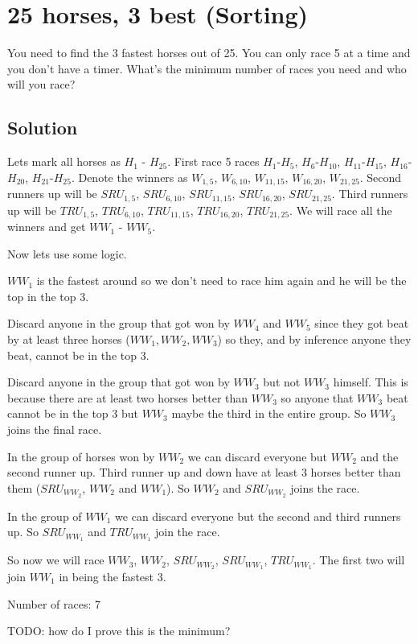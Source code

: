\documentclass{article}
\begin{document}
\section{25 horses, 3 best (Sorting)}
You need to find the 3 fastest horses out of 25. You can only race 5 at a time and you don't have a timer. What's
the minimum number of races you need and who will you race?

\subsection{Solution}
Lets mark all horses as $H_1$ - $H_{25}$.
First race 5 races $H_1$-$H_5$, $H_6$-$H_{10}$, $H_{11}$-$H_{15}$, $H_{16}$-$H_{20}$, $H_{21}$-$H_{25}$.
Denote the winners as $W_{1,5}$, $W_{6,10}$, $W_{11,15}$, $W_{16,20}$, $W_{21,25}$. 
Second runners up will be $SRU_{1,5}$, $SRU_{6,10}$, $SRU_{11,15}$, $SRU_{16,20}$, $SRU_{21,25}$.
Third runners up will be $TRU_{1,5}$, $TRU_{6,10}$, $TRU_{11,15}$, $TRU_{16,20}$, $TRU_{21,25}$.
We will race all the winners and get $WW_1$ - $WW_5$.

Now lets use some logic.

$WW_1$ is the fastest around so we don't need to race him again and he will be the top in the top 3.

Discard anyone in the group that got won by $WW_4$ and $WW_5$ since they got beat by at least three horses ($WW_1, WW_2, WW_3$) so they, and by inference anyone they beat, cannot be in the top 3.

Discard anyone in the group that got won by $WW_3$ but not $WW_3$ himself. This is because there are at least two horses better than $WW_3$ so anyone that $WW_3$ beat cannot be in the top 3 but $WW_3$ maybe the third in the entire group. So $WW_3$ joins the final race.

In the group of horses won by $WW_2$ we can discard everyone but $WW_2$ and the second runner up. Third runner up and down have at least 3 horses better than them ($SRU_{WW_2}$, $WW_2$ and $WW_1$). So $WW_2$ and $SRU_{WW_2}$ joins the race.

In the group of $WW_1$ we can discard everyone but the second and third runners up. So $SRU_{WW_1}$ and $TRU_{WW_1}$ join the race.

So now we will race $WW_3$, $WW_2$, $SRU_{WW_2}$, $SRU_{WW_1}$, $TRU_{WW_1}$. The first two will join $WW_1$ in being the fastest 3.

Number of races: 7

TODO: how do I prove this is the minimum?
\end{document}
